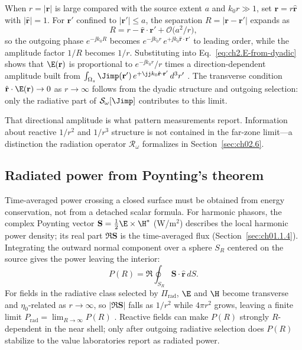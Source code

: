 When $r=|\mathbf{r}|$ is large compared with the source extent $a$ and $k_0 r\gg1$, set $\mathbf{r}=r\hat{\mathbf{r}}$ with $|\hat{\mathbf{r}}|=1$. For $\mathbf{r}'$ confined to $|\mathbf{r}'|\le a$, the separation $R=|\mathbf{r}-\mathbf{r}'|$ expands as
\begin{equation}
\label{eq:ch2.R-expansion}
R=r-\hat{\mathbf{r}}\cdot\mathbf{r}'+\mathcal{O}\!\big(a^2/r\big),
\end{equation}
so the outgoing phase $e^{-\jj k_0 R}$ becomes $e^{-\jj k_0 r}\,e^{+\jj k_0\hat{\mathbf{r}}\cdot\mathbf{r}'}$ to leading order, while the amplitude factor $1/R$ becomes $1/r$. Substituting into Eq.~\eqref{eq:ch2.E-from-dyadic} shows that $\E(\mathbf{r})$ is proportional to $e^{-\jj k_0 r}/r$ times a direction-dependent amplitude built from $\int_{\Omega_s}\Jimp(\mathbf{r}')\,e^{+\jj k_0\hat{\mathbf{r}}\cdot\mathbf{r}'}\,d^3r'$ \cite{stratton1941,jackson1999}. The transverse condition $\hat{\mathbf{r}}\cdot\E(\mathbf{r})\to0$ as $r\to\infty$ follows from the dyadic structure and outgoing selection: only the radiative part of $\mathcal{S}_\omega[\Jimp]$ contributes to this limit.

That directional amplitude is what pattern measurements report. Information about reactive $1/r^2$ and $1/r^3$ structure is not contained in the far-zone limit---a distinction the radiation operator $\mathcal{R}_\omega$ formalizes in Section~\ref{sec:ch02.6}.

\subsection{Radiated power from Poynting's theorem}
\label{sec:ch02.5.3}

Time-averaged power crossing a closed surface must be obtained from energy conservation, not from a detached scalar formula. For harmonic phasors, the complex Poynting vector $\mathbf{S}=\tfrac12\E\times\H^*$ (W/m$^2$) describes the local harmonic power density; its real part $\Re\mathbf{S}$ is the time-averaged flux (Section~\ref{sec:ch01.1.4}). Integrating the outward normal component over a sphere $S_R$ centered on the source gives the power leaving the interior:
\begin{equation}
\label{eq:ch2.power-sphere}
P(R)=\Re\oint_{S_R}\mathbf{S}\cdot\hat{\mathbf{r}}\,dS.
\end{equation}
For fields in the radiative class selected by $\Pi_{\mathrm{rad}}$, $\E$ and $\H$ become transverse and $\eta_0$-related as $r\to\infty$, so $|\Re\mathbf{S}|$ falls as $1/r^2$ while $4\pi r^2$ grows, leaving a finite limit $P_{\mathrm{rad}}=\lim_{R\to\infty}P(R)$ \cite{poynting1884,stratton1941}. Reactive fields can make $P(R)$ strongly $R$-dependent in the near shell; only after outgoing radiative selection does $P(R)$ stabilize to the value laboratories report as radiated power.

